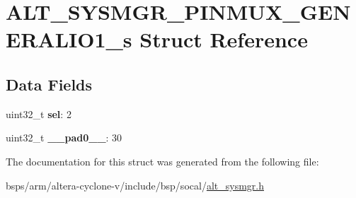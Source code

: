 \hypertarget{structALT__SYSMGR__PINMUX__GENERALIO1__s}{}\section{A\+L\+T\+\_\+\+S\+Y\+S\+M\+G\+R\+\_\+\+P\+I\+N\+M\+U\+X\+\_\+\+G\+E\+N\+E\+R\+A\+L\+I\+O1\+\_\+s Struct Reference}
\label{structALT__SYSMGR__PINMUX__GENERALIO1__s}
\subsection*{Data Fields}
\begin{DoxyCompactItemize}
\item 
\mbox{\label{structALT__SYSMGR__PINMUX__GENERALIO1__s_ab2ac86abb651084d687adeed47753dbf}} 
uint32\+\_\+t {\bfseries sel}\+: 2
\item 
\mbox{\label{structALT__SYSMGR__PINMUX__GENERALIO1__s_aae96dfc5fb02c6f708a43877e1d29643}} 
uint32\+\_\+t {\bfseries \+\_\+\+\_\+pad0\+\_\+\+\_\+}\+: 30
\end{DoxyCompactItemize}


The documentation for this struct was generated from the following file\+:\begin{DoxyCompactItemize}
\item 
bsps/arm/altera-\/cyclone-\/v/include/bsp/socal/\mbox{\hyperlink{alt__sysmgr_8h}{alt\+\_\+sysmgr.\+h}}\end{DoxyCompactItemize}

